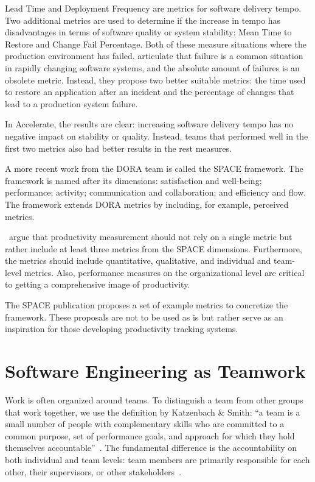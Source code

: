 Lead Time and Deployment Frequency are metrics for software delivery tempo. Two additional metrics are used to determine if the increase in tempo has disadvantages in terms of software quality or system stability: Mean Time to Restore and Change Fail Percentage. Both of these measure situations where the production environment has failed. \citet{forsgren_accelerate_2018} articulate that failure is a common situation in rapidly changing software systems, and the absolute amount of failures is an obsolete metric. Instead, they propose two better suitable metrics: the time used to restore an application after an incident and the percentage of changes that lead to a production system failure. 

In Accelerate, the results are clear: increasing software delivery tempo has no negative impact on stability or quality. Instead, teams that performed well in the first two metrics also had better results in the rest measures. 

A more recent work from the DORA team is called the SPACE framework. The framework is named after its dimensions: satisfaction and well-being; performance; activity; communication and collaboration; and efficiency and flow. The framework extends DORA metrics by including, for example, perceived metrics.~\cite{forsgren_space_2021} 

\citet{forsgren_space_2021}~argue that productivity measurement should not rely on a single metric but rather include at least three metrics from the SPACE dimensions. Furthermore, the metrics should include quantitative, qualitative, and individual and team-level metrics. Also, performance measures on the organizational level are critical to getting a comprehensive image of productivity. 

The SPACE publication proposes a set of example metrics to concretize the framework. These proposals are not to be used as is but rather serve as an inspiration for those developing productivity tracking systems.~\cite{forsgren_space_2021}

\section{Software Engineering as Teamwork}

Work is often organized around teams. To distinguish a team from other groups that work together, we use the definition by Katzenbach \& Smith: ``a team is a small number of people with complementary skills who are committed to a common purpose, set of performance goals, and approach for which they hold themselves accountable''~\cite{katzenbach_discipline_1993}. The fundamental difference is the accountability on both individual and team levels: team members are primarily responsible for each other, their supervisors, or other stakeholders~\cite{katzenbach_discipline_1993}.

